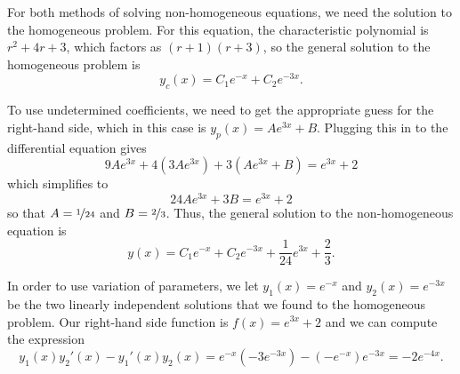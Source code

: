 \documentclass{ximera}
\begin{document}
\begin{exampleSol}
    For both methods of solving non-homogeneous equations, we need the solution to the homogeneous problem. For this equation, the characteristic polynomial is $r^2 + 4r + 3$, which factors as $(r+1)(r+3)$, so the general solution to the homogeneous problem is
    \begin{equation*}
        y_c(x) = C_1 e^{-x} + C_2e^{-3x}.
    \end{equation*}
    
    To use undetermined coefficients, we need to get the appropriate guess for the right-hand side, which in this case is $y_p(x) = Ae^{3x} + B$. Plugging this in to the differential equation gives
    \begin{equation*}
        9Ae^{3x} + 4(3Ae^{3x}) + 3(Ae^{3x} + B) = e^{3x} + 2
    \end{equation*}
    which simplifies to
    \begin{equation*}
        24Ae^{3x} + 3B = e^{3x} + 2
    \end{equation*}
    so that $A = \nicefrac{1}{24}$ and $B = \nicefrac{2}{3}$. Thus, the general solution to the non-homogeneous equation is
    \begin{equation*}
        y(x) = C_1e^{-x} + C_2e^{-3x} + \frac{1}{24}e^{3x} + \frac{2}{3}.
    \end{equation*}
    
    In order to use variation of parameters, we let $y_1(x) = e^{-x}$ and $y_2(x) = e^{-3x}$ be the two linearly independent solutions that we found to the homogeneous problem. Our right-hand side function is $f(x) = e^{3x} + 2$ and we can compute the expression
    \begin{equation*}
        y_1(x)y_2'(x) - y_1'(x)y_2(x) = e^{-x}(-3e^{-3x}) - (-e^{-x})e^{-3x} = -2e^{-4x}.
    \end{equation*}
    

\end{exampleSol}
\end{document}
